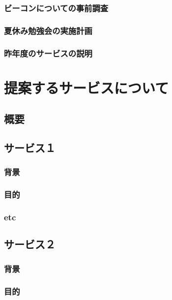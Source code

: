 \documentclass[openany,11pt,papersize]{jsbook}
\begin{document}
\subsection{ビーコンについての事前調査}

\subsection{夏休み勉強会の実施計画}

\subsection{昨年度のサービスの説明}



\chapter{提案するサービスについて}

\section{概要}


\section{サービス１}

\subsection{背景}

\subsection{目的}

\subsection{etc}

\section{サービス２}

\subsection{背景}

\subsection{目的}
\end{document}
